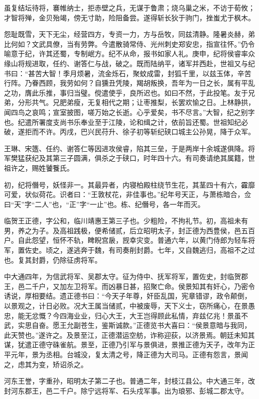 \documentclass[12pt,UTF8]{ctexbook}
\begin{document}
虽复结坛待将，褰帷纳士，拒赤壁之兵，无谋于鲁肃；烧乌巢之米，不访于荀攸；才智将殚，金贝殆竭，傍无寸助，险阻备尝。遂得斩长狄于驹门，挫蚩尤于枫木。

怨耻既雪，天下无尘，经营四方，专资一力，方与岳牧，同兹清静。隆暑炎赫，弟比何如？文武具僚，当有劳弊。今遣散骑常侍、光州刺史郑安忠，指宣往怀。”仍令喻意于纪，许其还蜀，专制岷方。纪不从命，报书如家人礼。庚申，纪将侯睿率众缘山将规进取，任约、谢答仁与战，破之。既而陆纳平，诸军并西赴，世祖又与纪书曰：“甚苦大智！季月烦暑，流金烁石，聚蚊成雷，封狐千里，以兹玉体，辛苦行阵。乃眷西顾，我劳如何？自獯丑凭陵，羯胡叛换，吾年为一日之长，属有平乱之功，膺此乐推，事归当璧。傥遣使乎，良所迟也。如曰不然，于此投笔。友于兄弟，分形共气。兄肥弟瘦，无复相代之期；让枣推梨，长罢欢愉之日。上林静拱，闻四鸟之哀鸣；宣室披图，嗟万始之长逝。心乎爱矣，书不尽言。”大智，纪之别字也。纪遣所署度支尚书乐奉业至于江陵，论和缉之计，依前旨还蜀。世祖知纪必破，遂拒而不许。丙戌，巴兴民苻升、徐子初等斩纪硖口城主公孙晃，降于众军。

王琳、宋簉、任约、谢答仁等因进攻侯睿，陷其三垒，于是两岸十余城遂俱降。将军樊猛获纪及其第三子圆满，俱杀之于硖口，时年四十六。有司奏请绝其属籍，世祖许之，赐姓饕餮氏。

初，纪将僭号，妖怪非一。其最异者，内寝柏殿柱绕节生花，其茎四十有六，靃靡可爱，状似荷花。识者曰：“王敦杖花，非佳事也。”纪年号天正，与萧栋暗合，佥曰“天”字“二人”也，“正”字“一止”也。栋、纪僭号，各一年而灭。

临贺王正德，字公和，临川靖惠王第三子也。少粗险，不拘礼节。初，高祖未有男，养之为子。及高祖践极，便希储贰，后立昭明太子，封正德为西豊侯，邑五百户。自此怨望，恒怀不轨，睥睨宫扆，觊幸灾变。普通六年，以黄门侍郎为轻车将军，置佐史。顷之，遂逃奔于魏，有司奏削封爵。七年，又自魏逃归，高祖不之过也。复其封爵，仍除征虏将军。

中大通四年，为信武将军、吴郡太守。征为侍中、抚军将军，置佐史，封临贺郡王，邑二千户，又加左卫将军。而凶暴日甚，招聚亡命。侯景知其有奸心，乃密令诱说，厚相要结。遗正德书曰：“今天子年尊，奸臣乱国，宪章错谬，政令颠倒，以景观之，计日必败。况大王属当储贰，中被废辱，天下义士，窃所痛心，在景愚忠，能无忿慨？今四海业业，归心大王，大王岂得顾此私情，弃兹亿兆！景虽不武，实思自奋。愿王允副苍生，鉴斯诚款。”正德览书大喜曰：“侯景意暗与我同，此天赞也。”遂许之。及景至江，正德潜运空舫，诈称迎荻，以济景焉。朝廷未知其谋，犹遣正德守硃雀航。景至，正德乃引军与景俱进，景推正德为天子，改年为正平元年，景为丞相。台城没，复太清之号，降正德为大司马。正德有怨言，景闻之，虑其为变，矫诏杀之。

河东王誉，字重孙，昭明太子第二子也。普通二年，封枝江县公。中大通三年，改封河东郡王，邑二千户。除宁远将军、石头戍军事。出为琅邪、彭城二郡太守。
\end{document}
